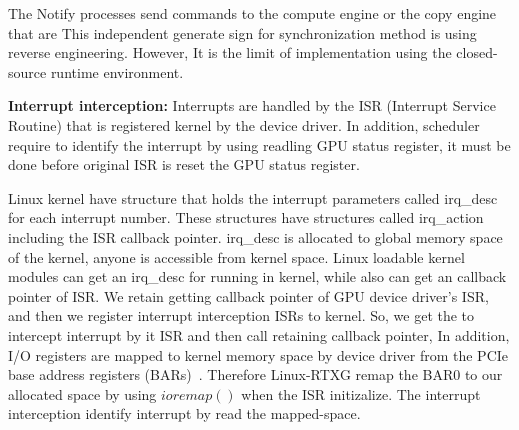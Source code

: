 The Notify processes send commands to the compute engine or the copy engine that are
This independent generate sign for synchronization method is using reverse engineering.
However, It is the limit of implementation using the closed-source runtime environment.


\textbf{Interrupt interception:}
Interrupts are handled by the ISR (Interrupt Service Routine) that is registered kernel by the device driver.
In addition, scheduler require to identify the interrupt by using readling GPU status register, it must be done before original ISR is reset the GPU status register.

Linux kernel have structure that holds the interrupt parameters called irq\_desc for each interrupt number.
These structures have structures called irq\_action including the ISR callback pointer.
irq\_desc is allocated to global memory space of the kernel, anyone is accessible from kernel space.
Linux loadable kernel modules can get an irq\_desc for running in kernel, while also can get an callback pointer of ISR.
We retain getting callback pointer of GPU device driver's ISR, and then we register interrupt interception ISRs to kernel.
So, we get the to intercept interrupt by it ISR and then call retaining callback pointer, 
In addition, I/O registers are mapped to kernel memory space by device driver from the PCIe base address registers (BARs)~\cite{fujii:icpads2013,kato2013zero}.
Therefore Linux-RTXG remap the BAR0 to our allocated space by using $ioremap()$ when the ISR initizalize.
The interrupt interception identify interrupt by read the mapped-space.

